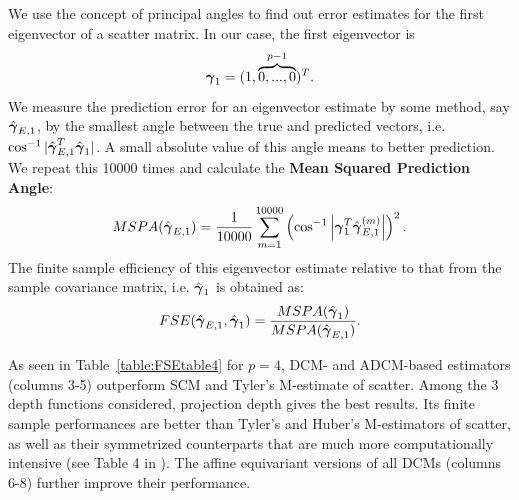 We use the concept of principal angles \citep{miao92} to find out error estimates for the first eigenvector of a scatter matrix. In our case, the first eigenvector is
%
$$
{\boldsymbol{\gamma}}_1 = (1,\overbrace{0,...,0}^{p-1})^T.
$$
%
We measure the prediction error for an eigenvector estimate by some method, say $\hat{{\boldsymbol{\gamma}}}_{E,1}$, by the smallest angle between the true and predicted vectors, i.e. $ \cos^{-1} | \hat{{\boldsymbol{\gamma}}}_{E,1}^T \hat{{\boldsymbol{\gamma}}}_1 | $. A small absolute value of this angle means to better prediction. We repeat this 10000 times and calculate the \textbf{Mean Squared Prediction Angle}:
%
$$
MSPA(\hat {{\boldsymbol{\gamma}}}_{E,1}) =
\frac{1}{10000} \sum_{m=1}^{10000} \left( \cos^{-1} \left|{\boldsymbol{\gamma}}_1^T \hat{{\boldsymbol{\gamma}}}^{(m)}_{E,1} \right| \right)^2.
$$
%
The finite sample efficiency of this eigenvector estimate relative to that from the sample covariance matrix, i.e. $\hat{{\boldsymbol{\gamma}}}_1$ is obtained as:
$$ FSE(\hat{{\boldsymbol{\gamma}}}_{E,1}, \hat{{\boldsymbol{\gamma}}}_1) = \frac{MSPA(\hat{{\boldsymbol{\gamma}}}_1)}{MSPA(\hat{{\boldsymbol{\gamma}}}_{E,1})}.$$

As seen in Table~\ref{table:FSEtable4} for $p = 4$, DCM- and ADCM-based estimators (columns 3-5) outperform SCM and Tyler's M-estimate of scatter. Among the 3 depth functions considered, projection depth gives the best results. Its finite sample performances are better than Tyler's and Huber's M-estimators of scatter, as well as their symmetrized counterparts that are much more computationally intensive (see Table 4 in \cite{sirkia07}). The affine equivariant versions of all DCMs (columns 6-8) further improve their performance.

